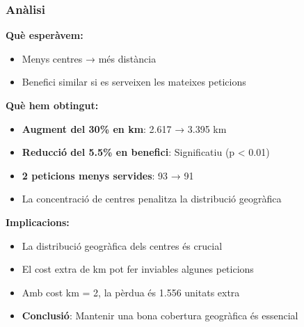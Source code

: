 \subsubsection{Anàlisi}

\textbf{Què esperàvem:}
\begin{itemize}
    \item Menys centres → més distància
    \item Benefici similar si es serveixen les mateixes peticions
\end{itemize}

\textbf{Què hem obtingut:}
\begin{itemize}
    \item \textbf{Augment del 30\% en km}: 2.617 → 3.395 km
    \item \textbf{Reducció del 5.5\% en benefici}: Significatiu (p < 0.01)
    \item \textbf{2 peticions menys servides}: 93 → 91
    \item La concentració de centres penalitza la distribució geogràfica
\end{itemize}

\textbf{Implicacions:}
\begin{itemize}
    \item La distribució geogràfica dels centres és crucial
    \item El cost extra de km pot fer inviables algunes peticions
    \item Amb cost km = 2, la pèrdua és 1.556 unitats extra
    \item \textbf{Conclusió}: Mantenir una bona cobertura geogràfica és essencial
\end{itemize}
